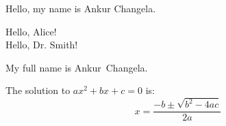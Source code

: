 \documentclass{article}
\newcommand{\MyName}{Ankur Changela}
\newcommand{\sayhello}[1]{Hello, #1!}
\newcommand{\fullName}[2]{#1\ #2}
\newcommand{\quadratic}[3]{\frac{-#2 \pm \sqrt{#2^2 - 4 #1 #3}}{2 #1}}
\begin{document}
Hello, my name is \MyName.

\sayhello{Alice} \\
\sayhello{Dr. Smith}

My full name is \fullName{Ankur}{Changela}.

The solution to $ax^2 + bx + c = 0$ is: \\
\[
x = \quadratic{a}{b}{c}
\]
\end{document}
